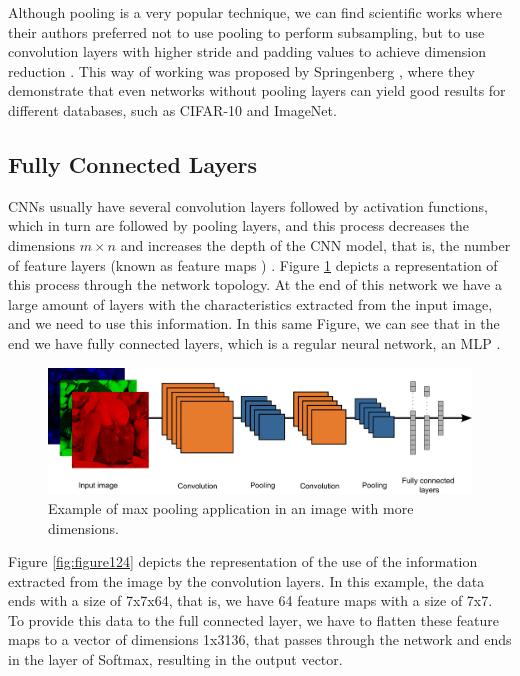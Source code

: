 Although pooling is a very popular technique, we can find scientific works where their authors preferred not to use pooling to perform subsampling, but to use convolution layers with higher stride and padding values to achieve dimension reduction \cite{elgendy2020}\cite{adrian2017}. This way of working was proposed by Springenberg \cite{springenberg2014striving}, where they demonstrate that even networks without pooling layers can yield good results for different databases, such as CIFAR-10 and ImageNet.

\subsection{Fully Connected Layers}

CNNs usually have several convolution layers followed by activation functions, which in turn are followed by pooling layers, and this process decreases the dimensions $m \times n$ and increases the depth of the CNN model, that is, the number of feature layers (known as feature maps ) \cite{elgendy2020}\cite{geron2019}. Figure \ref{fig:figure123} depicts a representation of this process through the network topology. At the end of this network we have a large amount of layers with the characteristics extracted from the input image, and we need to use this information. In this same Figure, we can see that in the end we have fully connected layers, which is a regular neural network, an MLP \cite{elgendy2020}.

\begin{figure}
    \centering
    \includegraphics[scale=0.22]{images/figure123.png}
    \caption{Example of max pooling application  in an image with more dimensions.}
    \label{fig:figure123}
\end{figure}

Figure \ref{fig:figure124} depicts the representation of the use of the information extracted from the image by the convolution layers. In this example, the data ends with a size of 7x7x64, that is, we have 64 feature maps with a size of 7x7. To provide this data to the full connected layer, we have to flatten these feature maps to a vector of dimensions 1x3136, that passes through the network and ends in the layer of Softmax, resulting in the output vector.

